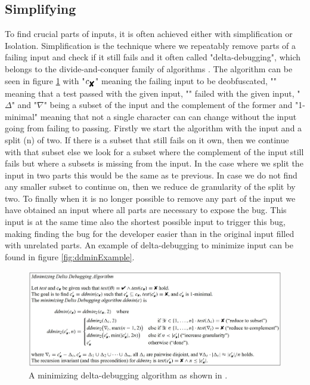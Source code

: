 \subsection{Simplifying}
\label{cha:3:Simplifying}
To find crucial parts of inputs, it is often achieved either with simplification or Isolation. 
Simplification is the technique where we repeatably remove parts of a failing input and check if it still fails and it often called "delta-debugging", which belongs to the divide-and-conquer family of algorithms \cite{2FuzzingAndDeltaDebuggingSMTSolvers}. 
The algorithm can be seen in figure \ref{fig:ddmin} with 
"$ c_{\mbox{\ding{56}}} $"  %
meaning the failing input to be deobfuscated,
"" %
meaning that a test passed with the given input,
"" %
failed with the given input, 
"$\Delta$" and "$\nabla$" being a subset of the input and the complement of the former and
"1-minimal" meaning that not a single character can can change without the input going from failing to passing. Firstly we start the algorithm with the input and a split (n) of two. If there is a subset that still fails on it own, then we continue with that subset else we look for a subset where the complement of the input still fails but where a subsets is missing from the input. In the case where we split the input in two parts this would be the same as te previous. In case we do not find any smaller subset to continue on, then we reduce de granularity of the split by two. To finally when it is no longer possible to remove any part of the input we have obtained an input where all parts are necessary to expose the bug. This input is at the same time also the shortest possible input to trigger this bug, making finding the bug for the developer easier than in the original input filled with unrelated parts. An example of delta-debugging to minimize input can be found in figure \ref{fig:ddminExample}.
\begin{figure}
	\centering
	\includegraphics[width=1.0\textwidth]{images/ddminFromPaper5edit}
	\caption{A minimizing delta-debugging algorithm as shown in \cite{5zeller2002simplifyingIsolatingFailure-inducing}.}
	\label{fig:ddmin}
\end{figure}

